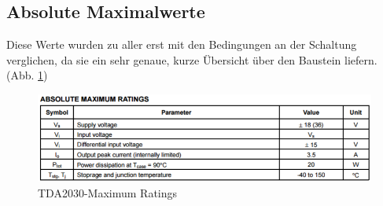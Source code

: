 \subsection{Absolute Maximalwerte}\label{subsec:8.3.1}
Diese Werte wurden zu aller erst mit den Bedingungen an der Schaltung verglichen, da sie ein sehr genaue, kurze Übersicht über den Baustein liefern. (Abb. \ref{fig:8.3.1.1})
\begin{figure} [H]
	\centering
	\includegraphics[width=1\textwidth]{img/Grundlagen/TDA2030/TDA2030MaximumRatings.PNG}
	\caption[TDA2030-Maximum Ratings]{TDA2030-Maximum Ratings\footnotemark}
	\label {fig:8.3.1.1}
\end{figure}

